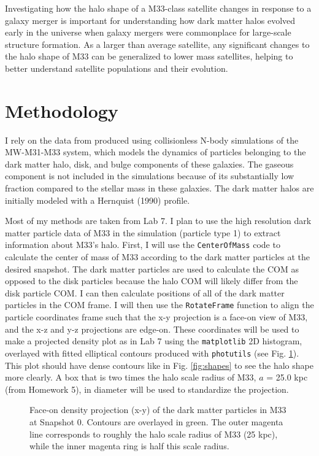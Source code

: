 \documentclass[twocolumn, linenumbers,trackchanges]{aastex7}
\begin{document}
Investigating how the halo shape of a M33-class satellite changes in response to a galaxy merger is important for understanding how dark matter halos evolved early in the universe when galaxy mergers were commonplace for large-scale structure formation. As a larger than average satellite, any significant changes to the halo shape of M33 can be generalized to lower mass satellites, helping to better understand satellite populations and their evolution. 


\section{Methodology} 
I rely on the data from \cite{van_der_Marel_2012} produced using collisionless N-body simulations of the MW-M31-M33 system, which models the dynamics of particles belonging to the dark matter halo, disk, and bulge components of these galaxies. The gaseous component is not included in the simulations because of its substantially low fraction compared to the stellar mass in these galaxies. The dark matter halos are initially modeled with a Hernquist (1990) profile. 

Most of my methods are taken from Lab 7. I plan to use the high resolution dark matter particle data of M33 in the simulation (particle type 1) to extract information about M33's halo. First, I will use the \texttt{CenterOfMass} code to calculate the center of mass of M33 according to the dark matter particles at the desired snapshot. The dark matter particles are used to calculate the COM as opposed to the disk particles because the halo COM will likely differ from the disk particle COM. I can then calculate positions of all of the dark matter particles in the COM frame. I will then use the \texttt{RotateFrame} function to align the particle coordinates frame such that the x-y projection is a face-on view of M33, and the x-z and y-z projections are edge-on. These coordinates will be used to make a projected density plot as in Lab 7 using the \texttt{matplotlib} 2D histogram, overlayed with fitted elliptical contours produced with \texttt{photutils} (see Fig. \ref{fig:M33dens}). This plot should have dense contours like in Fig. \ref{fig:shapes} to see the halo shape more clearly. A box that is two times the halo scale radius of M33, $a$ = 25.0 kpc (from Homework 5), in diameter will be used to standardize the projection. 

\begin{figure}[ht!]
\caption{Face-on density projection (x-y) of the dark matter particles in M33 at Snapshot 0. Contours are overlayed in green. The outer magenta line corresponds to roughly the halo scale radius of M33 (25 kpc), while the inner magenta ring is half this scale radius. 
\label{fig:M33dens}}
\end{figure}
\end{document}
